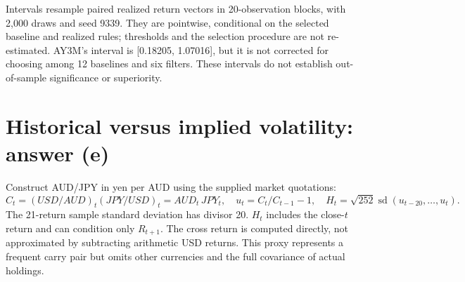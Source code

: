 \documentclass[10pt,letterpaper]{article}
\newcommand{\rCICondLow}{0.18205}
\newcommand{\rCICondHigh}{1.07016}
\begin{document}
Intervals resample paired realized return vectors in 20-observation blocks, with 2,000 draws
and seed 9339. They are pointwise, conditional on the selected baseline and realized rules;
thresholds and the selection procedure are not re-estimated. AY3M's interval is
[\rCICondLow{}, \rCICondHigh{}], but it is not corrected for choosing among 12 baselines and
six filters. These intervals do not establish out-of-sample significance or superiority.
\newpage
\section{Historical versus implied volatility: answer (e)}
Construct AUD/JPY in yen per AUD using the supplied market quotations:
\[
C_t=(USD/AUD)_t(JPY/USD)_t=AUD_t\,JPY_t,\quad u_t=C_t/C_{t-1}-1,
\quad H_t=\sqrt{252}\operatorname{sd}(u_{t-20},\ldots,u_t).
\]
The 21-return sample standard deviation has divisor 20. $H_t$ includes the close-$t$ return
and can condition only $R_{t+1}$. The cross return is computed directly, not approximated by
subtracting arithmetic USD returns. This proxy represents a frequent carry pair but omits
other currencies and the full covariance of actual holdings.
\end{document}

